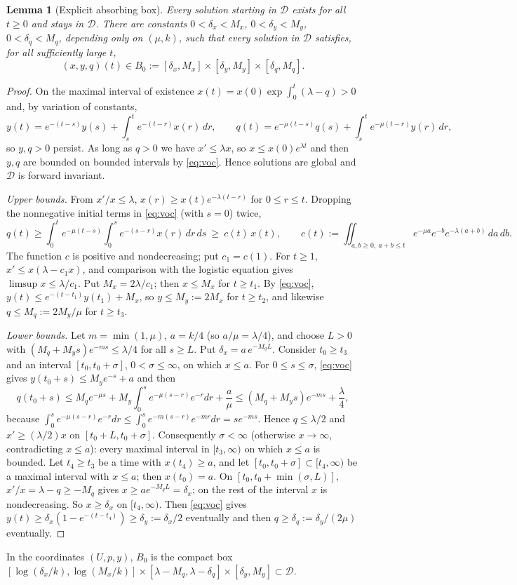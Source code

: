 \documentclass[11pt,a4paper]{article}
\numberwithin{equation}{section}
\newtheorem{lemma}[theorem]{Lemma}
\theoremstyle{remark}\newtheorem{remark}[theorem]{Remark}
\newcommand{\cD}{\mathcal D}
\begin{document}
\begin{lemma}[Explicit absorbing box]\label{lem:diss}
Every solution starting in $\cD$ exists for all $t\ge0$ and stays in $\cD$. There are constants
$0<\delta_x<M_x$, $0<\delta_y<M_y$, $0<\delta_q<M_q$, depending only on $(\mu,k)$, such that every solution in $\cD$
satisfies, for all sufficiently large $t$,
\[
(x,y,q)(t)\in B_0:=[\delta_x,M_x]\times[\delta_y,M_y]\times[\delta_q,M_q].
\]
\end{lemma}
\begin{proof}
On the maximal interval of existence $x(t)=x(0)\exp\int_0^t(\lambda-q)>0$ and, by variation of constants,
\begin{equation}\label{eq:voc}
y(t)=e^{-(t-s)}y(s)+\int_s^te^{-(t-r)}x(r)\,dr,\qquad q(t)=e^{-\mu(t-s)}q(s)+\int_s^te^{-\mu(t-r)}y(r)\,dr ,
\end{equation}
so $y,q>0$ persist. As long as $q>0$ we have $x'\le\lambda x$, so $x\le x(0)e^{\lambda t}$ and then $y,q$ are bounded
on bounded intervals by \eqref{eq:voc}. Hence solutions are global and $\cD$ is forward invariant.

\emph{Upper bounds.} From $x'/x\le\lambda$, $x(r)\ge x(t)e^{-\lambda(t-r)}$ for $0\le r\le t$. Dropping the
nonnegative initial terms in \eqref{eq:voc} (with $s=0$) twice,
\[
q(t)\ge\int_0^te^{-\mu(t-s)}\!\!\int_0^se^{-(s-r)}x(r)\,dr\,ds\ \ge\ c(t)\,x(t),\qquad
c(t):=\iint_{a,b\ge0,\ a+b\le t}e^{-\mu a}e^{-b}e^{-\lambda(a+b)}\,da\,db .
\]
The function $c$ is positive and nondecreasing; put $c_1=c(1)$. For $t\ge1$, $x'\le x(\lambda-c_1x)$, and comparison
with the logistic equation gives $\limsup x\le\lambda/c_1$. Put $M_x=2\lambda/c_1$; then $x\le M_x$ for $t\ge t_1$.
By \eqref{eq:voc}, $y(t)\le e^{-(t-t_1)}y(t_1)+M_x$, so $y\le M_y:=2M_x$ for $t\ge t_2$, and likewise
$q\le M_q:=2M_y/\mu$ for $t\ge t_3$.

\emph{Lower bounds.} Let $m=\min(1,\mu)$, $a=k/4$ (so $a/\mu=\lambda/4$), and choose $L>0$ with
$(M_q+M_ys)e^{-ms}\le\lambda/4$ for all $s\ge L$. Put $\delta_x=a\,e^{-M_qL}$. Consider $t_0\ge t_3$ and an interval
$[t_0,t_0+\sigma]$, $0<\sigma\le\infty$, on which $x\le a$. For $0\le s\le\sigma$, \eqref{eq:voc} gives
$y(t_0+s)\le M_ye^{-s}+a$ and then
\[
q(t_0+s)\le M_qe^{-\mu s}+M_y\int_0^se^{-\mu(s-r)}e^{-r}dr+\frac a\mu\le(M_q+M_ys)e^{-ms}+\frac\lambda4 ,
\]
because $\int_0^se^{-\mu(s-r)}e^{-r}dr\le\int_0^se^{-m(s-r)}e^{-mr}dr=se^{-ms}$. Hence $q\le\lambda/2$ and
$x'\ge(\lambda/2)x$ on $[t_0+L,t_0+\sigma]$. Consequently $\sigma<\infty$ (otherwise $x\to\infty$, contradicting
$x\le a$): every maximal interval in $[t_3,\infty)$ on which $x\le a$ is bounded. Let $t_4\ge t_3$ be a time with
$x(t_4)\ge a$, and let $[t_0,t_0+\sigma]\subset[t_4,\infty)$ be a maximal interval with $x\le a$; then $x(t_0)=a$.
On $[t_0,t_0+\min(\sigma,L)]$, $x'/x=\lambda-q\ge-M_q$ gives $x\ge ae^{-M_qL}=\delta_x$; on the rest of the interval
$x$ is nondecreasing. So $x\ge\delta_x$ on $[t_4,\infty)$. Then \eqref{eq:voc} gives
$y(t)\ge\delta_x(1-e^{-(t-t_4)})\ge\delta_y:=\delta_x/2$ eventually and then $q\ge\delta_q:=\delta_y/(2\mu)$
eventually.
\end{proof}
In the coordinates $(U,p,y)$, $B_0$ is the compact box
$[\log(\delta_x/k),\log(M_x/k)]\times[\lambda-M_q,\lambda-\delta_q]\times[\delta_y,M_y]\subset\cD$.
\end{document}
